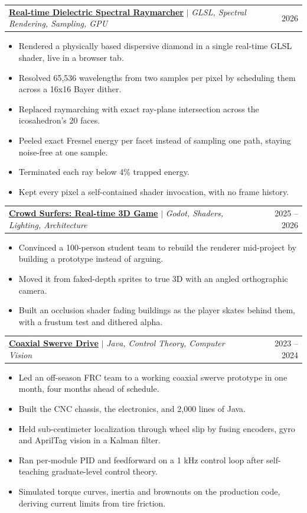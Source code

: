 \documentclass[letterpaper,9pt]{extarticle}
\makeatletter
\newcommand{\resumeItem}[1]{
  \item\small{#1}
}
\newcommand{\resumeProjectHeading}[2]{
    \item
    \begin{tabular*}{0.97\textwidth}{l@{\extracolsep{\fill}}r}
      \small#1 & #2 \\
    \end{tabular*}\vspace{-7pt}
}
\newcommand{\resumeItemListStart}{\begin{itemize}[leftmargin=0.2in, itemsep=3pt, parsep=0pt, topsep=3pt, partopsep=0pt]}
\newcommand{\resumeItemListEnd}{\end{itemize}\vspace{-3pt}}
\makeatother
\begin{document}
      \resumeProjectHeading
          {\href{https://logan.macaskill.com/experience/spectral-raymarcher}{\textbf{\underline{Real-time Dielectric Spectral Raymarcher}}} $|$ \emph{GLSL, Spectral Rendering, Sampling, GPU}}{2026}
          \resumeItemListStart
            \resumeItem{Rendered a physically based dispersive diamond in a single real-time GLSL shader, live in a browser tab.}
            \resumeItem{Resolved 65,536 wavelengths from two samples per pixel by scheduling them across a 16x16 Bayer dither.}
            \resumeItem{Replaced raymarching with exact ray-plane intersection across the icosahedron's 20 faces.}
            \resumeItem{Peeled exact Fresnel energy per facet instead of sampling one path, staying noise-free at one sample.}
            \resumeItem{Terminated each ray below 4\% trapped energy.}
            \resumeItem{Kept every pixel a self-contained shader invocation, with no frame history.}
          \resumeItemListEnd

      \resumeProjectHeading
          {\href{https://logan.macaskill.com/experience/crowd-surfers}{\textbf{\underline{Crowd Surfers: Real-time 3D Game}}} $|$ \emph{Godot, Shaders, Lighting, Architecture}}{2025 -- 2026}
          \resumeItemListStart
            \resumeItem{Convinced a 100-person student team to rebuild the renderer mid-project by building a prototype instead of arguing.}
            \resumeItem{Moved it from faked-depth sprites to true 3D with an angled orthographic camera.}
            \resumeItem{Built an occlusion shader fading buildings as the player skates behind them, with a frustum test and dithered alpha.}
          \resumeItemListEnd

      \resumeProjectHeading
          {\href{https://logan.macaskill.com/experience/coaxial-swerve-drive}{\textbf{\underline{Coaxial Swerve Drive}}} $|$ \emph{Java, Control Theory, Computer Vision}}{2023 -- 2024}
          \resumeItemListStart
            \resumeItem{Led an off-season FRC team to a working coaxial swerve prototype in one month, four months ahead of schedule.}
            \resumeItem{Built the CNC chassis, the electronics, and 2,000 lines of Java.}
            \resumeItem{Held sub-centimeter localization through wheel slip by fusing encoders, gyro and AprilTag vision in a Kalman filter.}
            \resumeItem{Ran per-module PID and feedforward on a 1 kHz control loop after self-teaching graduate-level control theory.}
            \resumeItem{Simulated torque curves, inertia and brownouts on the production code, deriving current limits from tire friction.}
          \resumeItemListEnd
\end{document}
